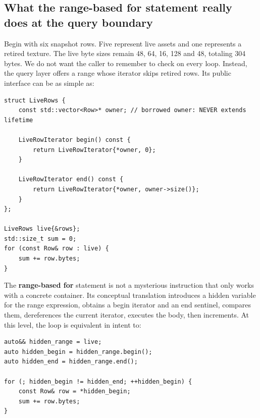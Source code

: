 \subsection{What the range-based for statement really does at the query boundary}\label{05-engine-i-ch006-what-the-range-based-for-statement-really-does-at-the-query-boundary}

\hypertarget{05-engine-i-ch006-what-the-range-based-for-statement-really-does-at-the-query-boundary}{}

Begin with six snapshot rows. Five represent live assets and one represents a retired texture. The live byte sizes remain 48, 64, 16, 128 and 48, totaling 304 bytes. We do not want the caller to remember to check  on every loop. Instead, the query layer offers a range whose iterator skips retired rows. Its public interface can be as simple as:

\begin{verbatim}
struct LiveRows {
    const std::vector<Row>* owner; // borrowed owner: NEVER extends lifetime

    LiveRowIterator begin() const {
        return LiveRowIterator{*owner, 0};
    }

    LiveRowIterator end() const {
        return LiveRowIterator{*owner, owner->size()};
    }
};

LiveRows live{&rows};
std::size_t sum = 0;
for (const Row& row : live) {
    sum += row.bytes;
}
\end{verbatim}

The \textbf{range-based for} statement is not a mysterious instruction that only works with a concrete container. Its conceptual translation introduces a hidden variable for the range expression, obtains a begin iterator and an end sentinel, compares them, dereferences the current iterator, executes the body, then increments. At this level, the loop is equivalent in intent to:

\begin{verbatim}
auto&& hidden_range = live;
auto hidden_begin = hidden_range.begin();
auto hidden_end = hidden_range.end();

for (; hidden_begin != hidden_end; ++hidden_begin) {
    const Row& row = *hidden_begin;
    sum += row.bytes;
}
\end{verbatim}

